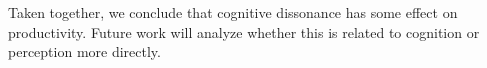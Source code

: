 Taken together, we conclude that cognitive dissonance has some effect on productivity.
Future work will analyze whether this is related to cognition or perception more directly.
